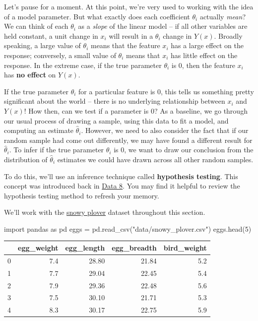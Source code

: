 \documentclass[
  letterpaper,
  DIV=11,
  numbers=noendperiod]{scrreprt}
\newenvironment{Shaded}{\begin{snugshade}}{\end{snugshade}}
\newcommand{\DecValTok}[1]{\textcolor[rgb]{0.68,0.00,0.00}{#1}}
\newcommand{\ImportTok}[1]{\textcolor[rgb]{0.00,0.46,0.62}{#1}}
\newcommand{\NormalTok}[1]{\textcolor[rgb]{0.00,0.23,0.31}{#1}}
\newcommand{\OperatorTok}[1]{\textcolor[rgb]{0.37,0.37,0.37}{#1}}
\newcommand{\StringTok}[1]{\textcolor[rgb]{0.13,0.47,0.30}{#1}}
\begin{document}
Let's pause for a moment. At this point, we're very used to working with
the idea of a model parameter. But what exactly does each coefficient
\(\theta_i\) actually \emph{mean}? We can think of each \(\theta_i\) as
a \emph{slope} of the linear model -- if all other variables are held
constant, a unit change in \(x_i\) will result in a \(\theta_i\) change
in \(Y(x)\). Broadly speaking, a large value of \(\theta_i\) means that
the feature \(x_i\) has a large effect on the response; conversely, a
small value of \(\theta_i\) means that \(x_i\) has little effect on the
response. In the extreme case, if the true parameter \(\theta_i\) is 0,
then the feature \(x_i\) has \textbf{no effect} on \(Y(x)\).

If the true parameter \(\theta_i\) for a particular feature is 0, this
tells us something pretty significant about the world -- there is no
underlying relationship between \(x_i\) and \(Y(x)\)! How then, can we
test if a parameter is 0? As a baseline, we go through our usual process
of drawing a sample, using this data to fit a model, and computing an
estimate \(\hat{\theta}_i\). However, we need to also consider the fact
that if our random sample had come out differently, we may have found a
different result for \(\hat{\theta}_i\). To infer if the true parameter
\(\theta_i\) is 0, we want to draw our conclusion from the distribution
of \(\hat{\theta}_i\) estimates we could have drawn across all other
random samples.

To do this, we'll use an inference technique called \textbf{hypothesis
testing}. This concept was introduced back in
\href{https://inferentialthinking.com/chapters/11/Testing_Hypotheses.html}{Data
8}. You may find it helpful to review the hypothesis testing method to
refresh your memory.

We'll work with the
\href{https://www.audubon.org/field-guide/bird/snowy-plover}{snowy
plover} dataset throughout this section.

\begin{Shaded}
\begin{Highlighting}[]
\ImportTok{import}\NormalTok{ pandas }\ImportTok{as}\NormalTok{ pd}
\NormalTok{eggs }\OperatorTok{=}\NormalTok{ pd.read\_csv(}\StringTok{"data/snowy\_plover.csv"}\NormalTok{)}
\NormalTok{eggs.head(}\DecValTok{5}\NormalTok{)}
\end{Highlighting}
\end{Shaded}

\begin{tabular}{lrrrr}
\toprule
{} &  egg\_weight &  egg\_length &  egg\_breadth &  bird\_weight \\
\midrule
0 &         7.4 &       28.80 &        21.84 &          5.2 \\
1 &         7.7 &       29.04 &        22.45 &          5.4 \\
2 &         7.9 &       29.36 &        22.48 &          5.6 \\
3 &         7.5 &       30.10 &        21.71 &          5.3 \\
4 &         8.3 &       30.17 &        22.75 &          5.9 \\
\bottomrule
\end{tabular}
\end{document}
